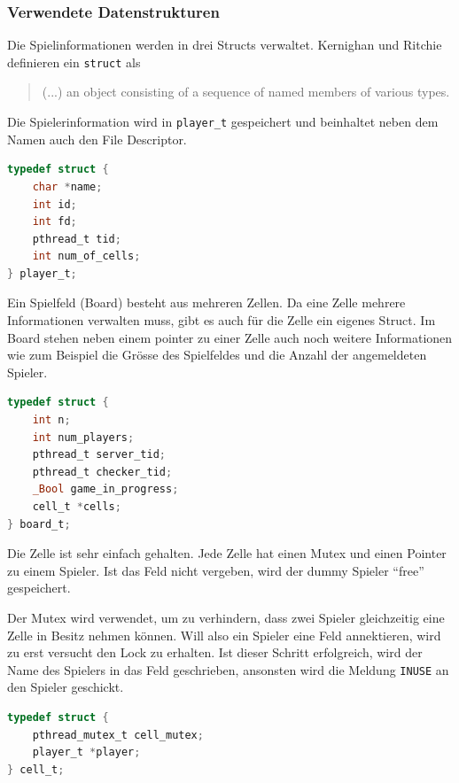 \subsubsection{Verwendete Datenstrukturen}
Die Spielinformationen werden in drei Structs verwaltet. Kernighan und Ritchie definieren ein \texttt{struct} als 
\begin{quote}
	(...) an object consisting of a sequence of named members of various types.
\end{quote}
\cite{c-bible}


Die Spielerinformation wird in \texttt{player\_t} gespeichert und beinhaltet neben dem Namen auch den File Descriptor.

\begin{lstlisting}[language=C,caption={Player Struct}]
typedef struct {
    char *name;
    int id;
    int fd;
    pthread_t tid;
    int num_of_cells;
} player_t;
\end{lstlisting}

Ein Spielfeld (Board) besteht aus mehreren Zellen. Da eine Zelle mehrere Informationen verwalten muss, gibt es auch für die Zelle ein eigenes Struct. Im Board stehen neben einem pointer zu einer Zelle auch noch weitere Informationen wie zum Beispiel die Grösse des Spielfeldes und die Anzahl der angemeldeten Spieler.

\begin{lstlisting}[language=c,caption={Board Struct}]
typedef struct {
    int n;
    int num_players;
    pthread_t server_tid;
    pthread_t checker_tid;
    _Bool game_in_progress;
    cell_t *cells;
} board_t;
\end{lstlisting}

Die Zelle ist sehr einfach gehalten. Jede Zelle hat einen Mutex und einen Pointer zu einem Spieler. Ist das Feld nicht vergeben, wird der dummy Spieler ``free'' gespeichert.

Der Mutex wird verwendet, um zu verhindern, dass zwei Spieler gleichzeitig eine Zelle in Besitz nehmen können. Will also ein Spieler eine Feld annektieren, wird zu erst versucht den Lock zu erhalten. Ist dieser Schritt erfolgreich, wird der Name des Spielers in das Feld geschrieben, ansonsten wird die Meldung \texttt{INUSE} an den Spieler geschickt.

\begin{lstlisting}[language=c,caption={Cell Struct}]
typedef struct {
    pthread_mutex_t cell_mutex;
    player_t *player;
} cell_t;
\end{lstlisting}
 
